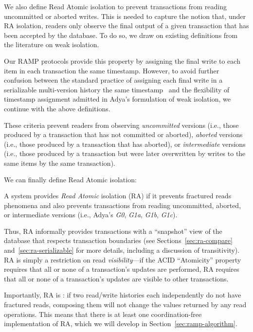 We also define Read Atomic isolation to prevent transactions from
reading uncommitted or aborted writes. This is needed to capture the
notion that, under RA isolation, readers only observe the final output
of a given transaction that has been accepted by the database. To do
so, we draw on existing definitions from the literature on weak
isolation.

Our RAMP protocols provide this property by assigning the final write
to each item in each transaction the same timestamp. However, to avoid
further confusion between the standard practice of assigning each
final write in a serializable multi-version history the same
timestamp~\cite{bernstein-book} and the flexibility of timestamp
assignment admitted in Adya's formulation of weak isolation, we
continue with the above definitions.

These criteria prevent readers from observing \textit{uncommitted}
versions (i.e., those produced by a transaction that has not committed
or aborted), \textit{aborted} versions (i.e., those produced by a
transaction that has aborted), or \textit{intermediate} versions
(i.e., those produced by a transaction but were later overwritten by
writes to the same items by the same transaction).

We can finally define Read Atomic isolation:

\begin{definition}
  A system provides \textit{Read Atomic} isolation (RA) if it prevents
  fractured reads phenomena and also prevents transactions from
  reading uncommitted, aborted, or intermediate versions (i.e., Adya's
  \textit{G0}, \textit{G1a}, \textit{G1b}, \textit{G1c}).
\end{definition}

Thus, RA informally provides transactions with a ``snapshot'' view of
the database that respects transaction boundaries (see
Sections~\ref{sec:ra-compare} and~\ref{sec:ra-serializable} for more
details, including a discussion of transitivity). RA is simply a
restriction on read \textit{visibility}---if the ACID ``Atomicity''
property requires that all or none of a transaction's updates are
performed, RA requires that all or none of a transaction's updates are
visible to other transactions.

Importantly, RA is \iconfluent: if two read/write histories each
independently do not have fractured reads, composing them will not
change the values returned by any read operations. This means that
there is at least one coordination-free implementation of RA, which we will
develop in Section~\ref{sec:ramp-algorithm}.

